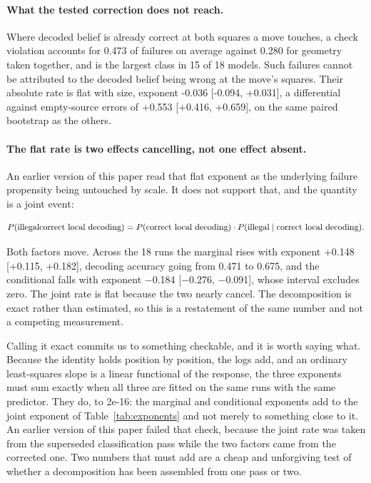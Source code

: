 \documentclass[11pt]{article}
\begin{document}
\paragraph{What the tested correction does not reach.}
Where decoded belief is already correct at both squares a move touches, a check
violation accounts for 0.473 of failures on average against
0.280 for geometry taken together, and is the largest class in
15 of 18 models. Such failures cannot be attributed
to the decoded belief being wrong at the move's squares. Their absolute rate is
flat with size, exponent -0.036 [-0.094, +0.031], a differential
against empty-source errors of +0.553 [+0.416,
+0.659], on the same paired bootstrap as the others.

\paragraph{The flat rate is two effects cancelling, not one effect absent.}
An earlier version of this paper read that flat exponent as the underlying failure
propensity being untouched by scale. It does not support that, and the quantity is
a joint event:

\begin{equation*}
P(\text{illegal} \\ \text{correct local decoding}) = P(\text{correct local decoding}) \cdot P(\text{illegal} \mid \text{correct local decoding}).
\end{equation*}

Both factors move. Across the 18 runs the marginal rises with exponent
+0.148 [+0.115, +0.182], decoding accuracy going from 0.471 to 0.675,
and the conditional falls with exponent $-$0.184 [$-$0.276, $-$0.091], whose interval
excludes zero. The joint rate is flat because the two nearly cancel. The
decomposition is exact rather than estimated, so this is a restatement of the same
number and not a competing measurement.

Calling it exact commits us to something checkable, and it is worth saying what.
Because the identity holds position by position, the logs add, and an ordinary
least-squares slope is a linear functional of the response, the three exponents
must sum exactly when all three are fitted on the same runs with the same
predictor. They do, to 2e-16: the marginal and conditional exponents
add to the joint exponent of Table~\ref{tab:exponents} and not merely to something
close to it. An earlier version of this paper failed that check, because the joint
rate was taken from the superseded classification pass while the two factors came
from the corrected one. Two numbers that must add are a cheap and unforgiving test
of whether a decomposition has been assembled from one pass or two.
\end{document}

